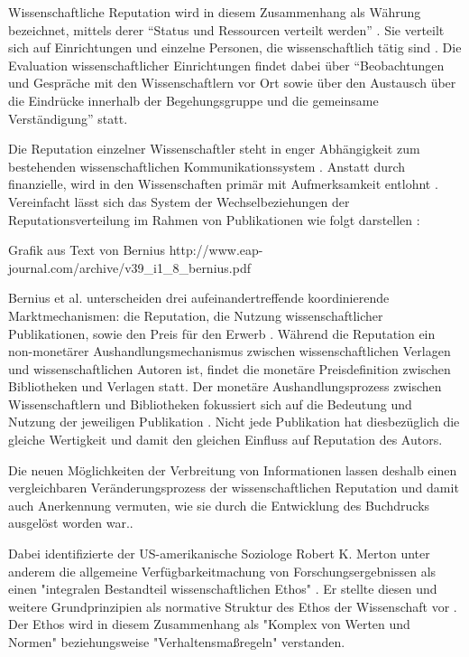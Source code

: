 Wissenschaftliche Reputation wird in diesem Zusammenhang als Währung bezeichnet, mittels derer “Status und Ressourcen verteilt werden” \cite{hanekop_2006}. Sie verteilt sich auf Einrichtungen und einzelne Personen, die wissenschaftlich tätig sind \cite{suchen}. Die Evaluation wissenschaftlicher Einrichtungen findet dabei über “Beobachtungen und Gespräche mit den Wissenschaftlern vor Ort sowie über den Austausch über die Eindrücke innerhalb der Begehungsgruppe und die gemeinsame Verständigung”\cite{Barl_sius_2008} statt. 

Die Reputation einzelner Wissenschaftler steht in enger Abhängigkeit zum bestehenden wissenschaftlichen Kommunikationssystem \cite{suchen}. Anstatt durch finanzielle, wird in den Wissenschaften primär mit Aufmerksamkeit entlohnt \cite{suchen}. Vereinfacht lässt sich das System der Wechselbeziehungen der Reputationsverteilung im Rahmen von Publikationen wie folgt darstellen \cite{cite:21a}: 

Grafik aus Text von Bernius
http://www.eap-journal.com/archive/v39_i1_8_bernius.pdf

Bernius et al. unterscheiden drei aufeinandertreffende koordinierende Marktmechanismen: die Reputation, die Nutzung wissenschaftlicher Publikationen, sowie den Preis für den Erwerb \cite{suchen}. Während die Reputation ein non-monetärer Aushandlungsmechanismus zwischen wissenschaftlichen Verlagen und wissenschaftlichen Autoren ist, findet die monetäre Preisdefinition zwischen Bibliotheken und Verlagen statt. Der monetäre Aushandlungsprozess zwischen Wissenschaftlern und Bibliotheken fokussiert sich auf die Bedeutung und Nutzung der jeweiligen Publikation \cite{cite:21a}. Nicht jede Publikation hat diesbezüglich die gleiche Wertigkeit \cite{suchen} und damit den gleichen Einfluss auf Reputation des Autors. 

Die neuen Möglichkeiten der Verbreitung von Informationen lassen deshalb einen vergleichbaren Veränderungsprozess der wissenschaftlichen Reputation und damit auch Anerkennung vermuten, wie sie durch die Entwicklung des Buchdrucks ausgelöst worden war.\cite{hanekop_2006}. 

Dabei identifizierte der US-amerikanische Soziologe Robert K. Merton unter anderem die allgemeine Verfügbarkeitmachung von Forschungsergebnissen als einen "integralen Bestandteil wissenschaftlichen Ethos" \cite{Fangerau_2014}. Er stellte diesen und weitere Grundprinzipien als normative Struktur des Ethos der Wissenschaft vor \cite{Merton_1985}. Der Ethos wird in diesem Zusammenhang als "Komplex von Werten und Normen"\cite{suchen} beziehungsweise "Verhaltensmaßregeln"\cite{suchen} verstanden.

